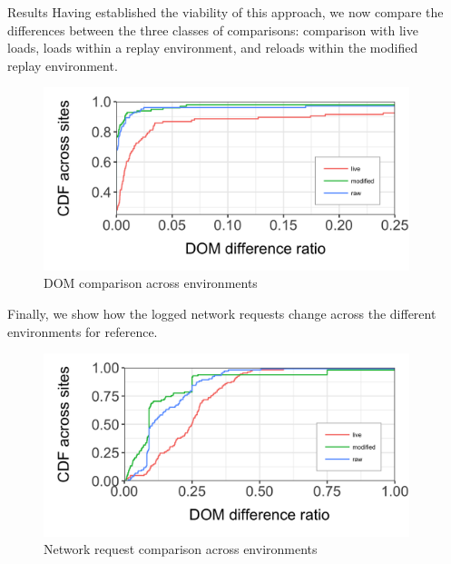 \documentclass[final]{beamer}
\newlength{\sepwid}
\newlength{\onecolwid}
\begin{document}
\begin{frame}[t]
\begin{columns}[t]
\begin{column}{\onecolwid}
\begin{block}{Results}
Having established the viability of this approach, we now compare the differences between the three classes of comparisons: comparison with live loads, loads within a replay environment, and reloads within the modified replay environment.

\begin{figure}
\vspace{0.5cm}
\includegraphics[width=0.9\linewidth]{dom_plot.png}
\caption{DOM comparison across environments}
\end{figure}

Finally, we show how the logged network requests change across the different environments for reference.

\begin{figure}
\vspace{0.5cm}
\includegraphics[width=0.8\linewidth]{network_plot.png}
\caption{Network request comparison across environments}
\end{figure}

\end{block}


\end{column} %

\begin{column}{\sepwid}\end{column} %


\end{columns}
\end{frame}
\end{document}
